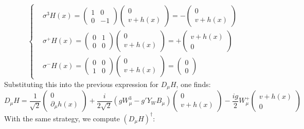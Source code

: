 \documentclass[../main.tex]{subfiles}
\begin{document}
\[
\left\{
\begin{aligned}
&\sigma^3H(x)=\left(\begin{array}{cc}
    1 & 0 \\
    0 & -1
\end{array}\right)\left(\begin{array}{c}
  0 \\
  v+h(x)
\end{array}\right)=-\left(\begin{array}{c}
  0 \\
  v+h(x)
\end{array}\right) \\
&\sigma^+H(x)=\left(\begin{array}{cc}
    0 & 1 \\
    0 & 0
\end{array}\right)\left(\begin{array}{c}
  0 \\
  v+h(x)
\end{array}\right)=+\left(\begin{array}{c}
  v+h(x) \\
  0
\end{array}\right) \\
&\sigma^-H(x)=\left(\begin{array}{cc}
    0 & 0 \\
    1 & 0
\end{array}\right)\left(\begin{array}{c}
  0 \\
  v+h(x)
\end{array}\right)=\left(\begin{array}{c}
  0 \\
  0
\end{array}\right)
\end{aligned}
\right.
\]
Substituting this into the previous expression for $D_\mu H$, one finds:
\[
D_\mu H=\frac{1}{\sqrt{2}}\begin{pmatrix}0 \\ \partial_\mu h(x)\end{pmatrix}+\frac{i}{2\sqrt{2}}(gW_\mu^3-g'Y_WB_\mu)\begin{pmatrix}0 \\ v+h(x)\end{pmatrix}-\frac{ig}{2}W_\mu^+\begin{pmatrix}v+h(x) \\ 0 \end{pmatrix}
\]
With the same strategy, we compute $(D_\mu H)^\dagger$:
\end{document}

